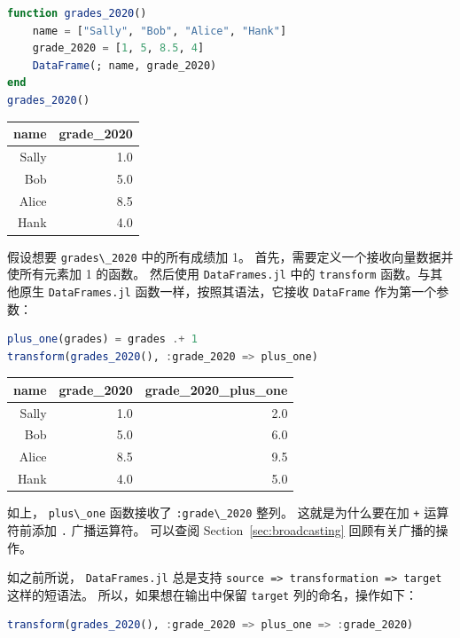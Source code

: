 \documentclass[
  notoc %
]{tufte-book}
\newcommand{\passthrough}[1]{#1}
\begin{document}
\begin{lstlisting}[language=Julia]
function grades_2020()
    name = ["Sally", "Bob", "Alice", "Hank"]
    grade_2020 = [1, 5, 8.5, 4]
    DataFrame(; name, grade_2020)
end
grades_2020()
\end{lstlisting}

\begin{longtable}[]{@{}rr@{}}
\toprule
name & grade\_2020 \\
\midrule
\endhead
Sally & 1.0 \\
Bob & 5.0 \\
Alice & 8.5 \\
Hank & 4.0 \\
\bottomrule
\end{longtable}

假设想要 \passthrough{\lstinline!grades\_2020!} 中的所有成绩加 1。
首先，需要定义一个接收向量数据并使所有元素加 1 的函数。 然后使用
\passthrough{\lstinline!DataFrames.jl!} 中的
\passthrough{\lstinline!transform!} 函数。与其他原生
\passthrough{\lstinline!DataFrames.jl!} 函数一样，按照其语法，它接收
\passthrough{\lstinline!DataFrame!} 作为第一个参数：

\begin{lstlisting}[language=Julia]
plus_one(grades) = grades .+ 1
transform(grades_2020(), :grade_2020 => plus_one)
\end{lstlisting}

\begin{longtable}[]{@{}rrr@{}}
\toprule
name & grade\_2020 & grade\_2020\_plus\_one \\
\midrule
\endhead
Sally & 1.0 & 2.0 \\
Bob & 5.0 & 6.0 \\
Alice & 8.5 & 9.5 \\
Hank & 4.0 & 5.0 \\
\bottomrule
\end{longtable}

如上， \passthrough{\lstinline!plus\_one!} 函数接收了
\passthrough{\lstinline!:grade\_2020!} 整列。 这就是为什么要在加
\passthrough{\lstinline!+!} 运算符前添加 \passthrough{\lstinline!.!}
广播运算符。 可以查阅 Section~\ref{sec:broadcasting}
回顾有关广播的操作。

如之前所说， \passthrough{\lstinline!DataFrames.jl!} 总是支持
\passthrough{\lstinline!source => transformation => target!}
这样的短语法。 所以，如果想在输出中保留 \passthrough{\lstinline!target!}
列的命名，操作如下：

\begin{lstlisting}[language=Julia]
transform(grades_2020(), :grade_2020 => plus_one => :grade_2020)
\end{lstlisting}
\end{document}
